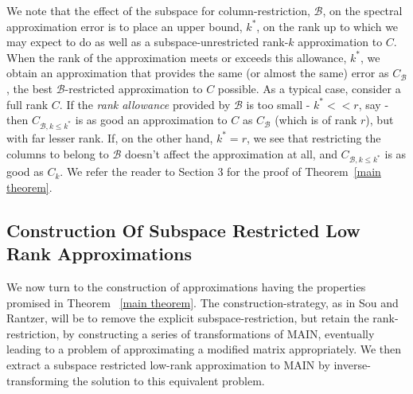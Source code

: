\documentclass[11pt]{article}
\newcommand{\B}{\mathcal{B}}
\begin{document}
\noindent We note that the effect of the subspace for column-restriction, $\B$, on the spectral approximation error is to place an upper bound, $k^*$, on the rank up to which we may expect to do as well as a subspace-unrestricted rank-$k$ approximation to $C$. When the rank of the approximation meets or exceeds this allowance, $k^*$, we obtain an approximation that provides the same (or almost the same) error as $C_{\B}$, the best $\B$-restricted approximation to $C$ possible. As a typical case, consider a full rank $C$. If the \emph{rank allowance} provided by $\B$ is too small - $k^* << r$, say - then $C_{\B, k\leq k^*}$ is as good an approximation to $C$ as $C_{\B}$ (which is of rank $r$), but with far lesser rank. If, on the other hand, $k^* = r$, we see that restricting the columns to belong to $\B$ doesn't affect the approximation at all, and $C_{\B, k \leq k^*}$ is as good as $C_k$. We refer the reader to Section 3 for the proof of Theorem~\ref{main theorem}. 

\subsection{Construction Of Subspace Restricted Low Rank Approximations}
We now turn to the construction of approximations having the properties promised in Theorem~ \ref{main theorem}. The construction-strategy, as in Sou and Rantzer, will be to remove the explicit subspace-restriction, but retain the rank-restriction, by constructing a series of transformations of MAIN, eventually leading to a problem of approximating a modified matrix appropriately. We then extract a subspace restricted low-rank approximation to MAIN by inverse-transforming the solution to this equivalent problem.
\end{document}
